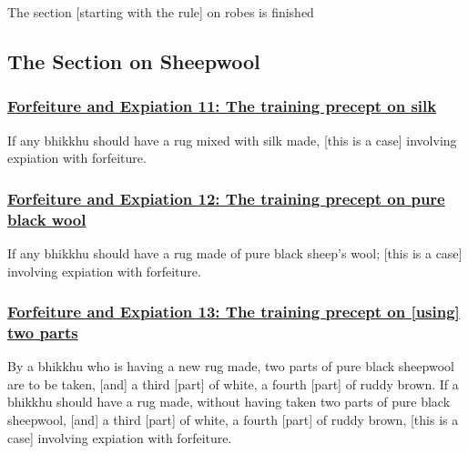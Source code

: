 \begin{center}
	The section [starting with the rule] on robes is finished
\end{center}



\setsubsecheadstyle{\subsectionFmt}
\subsection{The Section on Sheepwool}
\label{forf-exp-vagga2}

\subsubsection*{\hyperref[np11]{Forfeiture and Expiation 11: The training precept on silk}}
\label{forf-exp11}

If any bhikkhu should have a rug mixed with silk made, [this is a case] involving expiation with forfeiture.



\subsubsection*{\hyperref[np12]{Forfeiture and Expiation 12: The training precept on pure black wool}}
\label{forf-exp12}

If any bhikkhu should have a rug made of pure black sheep's wool; [this is a case] involving expiation with forfeiture.



\subsubsection*{\hyperref[np13]{Forfeiture and Expiation 13: The training precept on [using] two parts}}
\label{forf-exp13}

By a bhikkhu who is having a new rug made, two parts of pure black sheepwool are to be taken, [and] a third [part] of white, a fourth [part] of ruddy brown. If a bhikkhu should have a rug made, without having taken two parts of pure black sheepwool, [and] a third [part] of white, a fourth [part] of ruddy brown, [this is a case] involving expiation with forfeiture.



